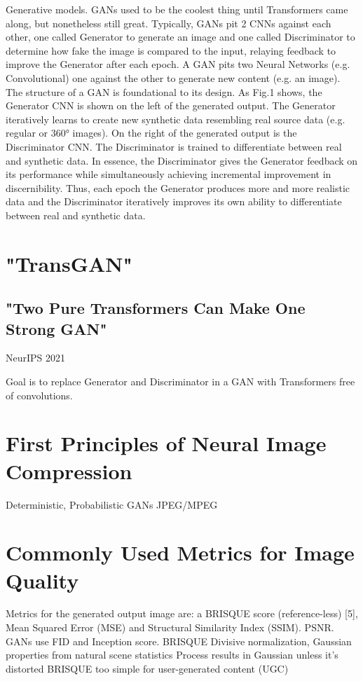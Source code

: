 Generative models.
GANs used to be the coolest thing until Transformers came along, but nonetheless 
still great. Typically, GANs pit 2 CNNs against each other, one called Generator to 
generate an image and one called Discriminator to determine how fake the image is 
compared to the input, relaying feedback to improve the Generator after each epoch. 
A GAN pits two Neural Networks (e.g. Convolutional) one against the other to generate 
new content (e.g. an image). The structure of a GAN is foundational to its design. 
As Fig.1 shows, the Generator CNN is shown on the left of the generated output. 
The Generator iteratively learns to create new synthetic data resembling real source data 
(e.g. regular or 360° images).  On the right of the generated output is the Discriminator CNN.
The Discriminator is trained to differentiate between real and synthetic data. 
In essence, the Discriminator gives the Generator feedback on its performance while 
simultaneously achieving incremental improvement in discernibility. 
Thus, each epoch the Generator produces more and more realistic data and the Discriminator iteratively improves its own ability to differentiate between real and synthetic data.


\section{"TransGAN"}
\subsection{"Two Pure Transformers Can Make One Strong GAN"}
NeurIPS 2021

Goal is to replace Generator and Discriminator in a GAN with Transformers free of 
convolutions. 

\section{First Principles of Neural Image Compression}

Deterministic, Probabilistic
GANs
JPEG/MPEG

\section{Commonly Used Metrics for Image Quality}
Metrics for the generated output image are: a BRISQUE score (reference-less) [5], 
Mean Squared Error (MSE) and Structural Similarity Index (SSIM). PSNR.
GANs use FID and Inception score. 
BRISQUE \citep{BRISQUE}
Divisive normalization, Gaussian properties from natural scene statistics
Process results in Gaussian unless it's distorted
BRISQUE too simple for user-generated content (UGC)